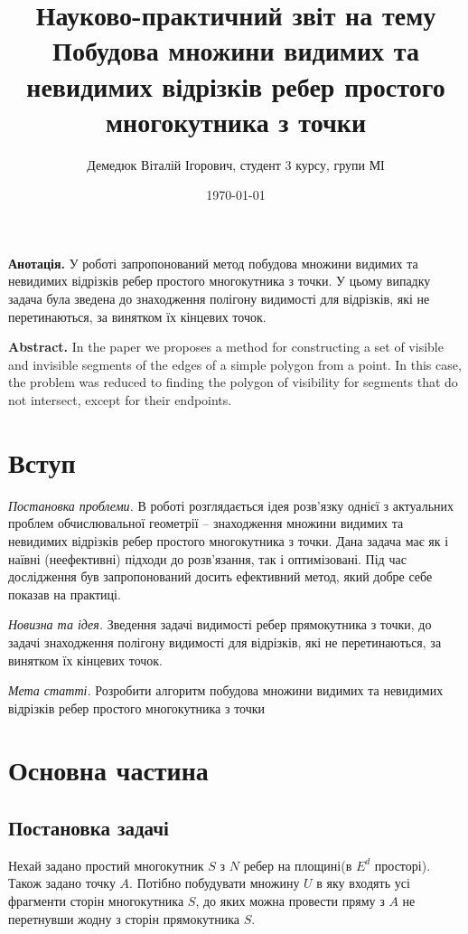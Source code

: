 \documentclass[a4paper, 12pt]{article}
\author{Демедюк Віталій Ігорович, студент 3 курсу, групи МІ}
\title{Науково-практичний звіт на тему\\
	   Побудова множини видимих та невидимих відрізків ребер 		       простого многокутника з точки}
\date{\today}
\begin{document}
\maketitle

\newpage
\tableofcontents

\newpage

\textbf{Анотація.} У роботі запропонований метод побудова множини видимих та невидимих відрізків ребер простого многокутника з точки. У цьому випадку задача була зведена до знаходження полігону видимості для відрізків, які не перетинаються, за винятком їх кінцевих точок.

\textbf{Abstract.} In the paper we proposes a method for constructing a set of visible and invisible segments of the edges of a simple polygon from a point. In this case, the problem was reduced to finding the polygon of visibility for segments that do not intersect, except for their endpoints.

\section{Вступ}

\textit{Постановка проблеми.} В роботі розглядається ідея розв'язку однієї з актуальних проблем обчислювальної геометрії -- знаходження множини видимих та невидимих відрізків ребер 		       простого многокутника з точки. Дана задача має як і наївні (неефективні) підходи до розв'язання, так і оптимізовані. Під час дослідження був запропонований досить ефективний метод, який добре себе показав на практиці.

\textit{Новизна та ідея.} Зведення задачі видимості ребер прямокутника з точки, до задачі знаходження полігону видимості для відрізків, які не перетинаються, за винятком їх кінцевих точок.

\textit{Мета статті.} Розробити алгоритм побудова множини видимих та невидимих відрізків ребер простого многокутника з точки 

\section{Основна частина}

\subsection{Постановка задачі}

Нехай задано простий многокутник $S$ з $N$ ребер на площині(в $E^d $ просторі). Також задано точку $A$. Потібно побудувати множину $U$ в яку входять усі фрагменти сторін многокутника $S$, до яких можна провести пряму з $A$ не перетнувши жодну з сторін прямокутника $S$.
\end{document}

